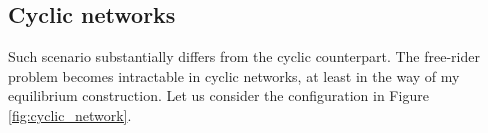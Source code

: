 \documentclass[12pt,letter]{article}
\theoremstyle{definition}
\theoremstyle{remark}
\theoremstyle{claim}
\begin{document}
%
%
%
%
%
%
%
%
\subsection{Cyclic networks}
\label{sec:cyclic}


Such scenario substantially differs from the cyclic counterpart. The free-rider problem becomes intractable in cyclic networks, at least in the way of my equilibrium construction. Let us consider the configuration in Figure \ref{fig:cyclic_network}.
\end{document}
